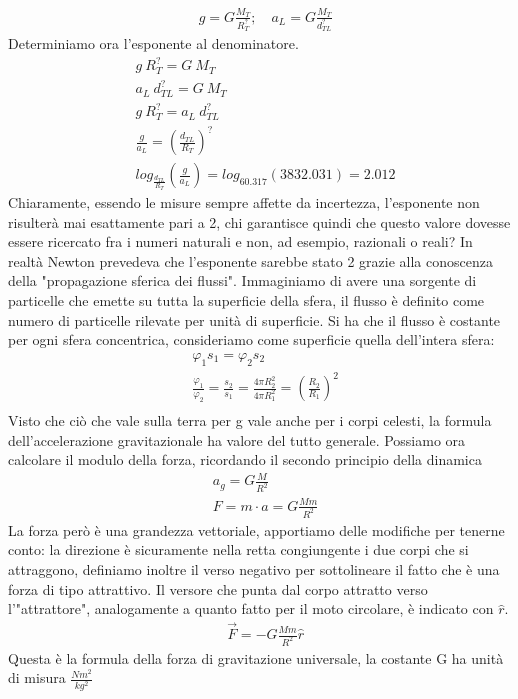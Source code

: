 \begin{align*}
	&g = G \frac{M_T}{R_T^?};\quad a_L = G \frac{M_T}{d_{TL}^?}
\end{align*}
Determiniamo ora l'esponente al denominatore. 
\begin{align*}
	&g\ R_T^? = G\ M_T\\
	&a_L\ d_{TL}^? = G\ M_T\\
	& g\ R_T^? = a_L\ d_{TL}^?\\
	&\frac{g}{a_L} = (\frac{d_{TL}}{R_T})^?\\
	&log_{\frac{d_{TL}}{R_T}}(\frac{g}{a_L}) = log_{60.317}(3832.031) = 2.012
\end{align*}
Chiaramente, essendo le misure sempre affette da incertezza, l'esponente non risulterà mai esattamente pari a 2, chi garantisce quindi che questo valore dovesse essere ricercato fra i numeri naturali e non, ad esempio, razionali o reali? In realtà Newton prevedeva che l'esponente sarebbe stato 2 grazie alla conoscenza della "propagazione sferica dei flussi". Immaginiamo di avere una sorgente di particelle che emette su tutta la superficie della sfera, il flusso è definito come numero di particelle rilevate per unità di superficie. Si ha che il flusso è costante per ogni sfera concentrica, consideriamo come superficie quella dell'intera sfera:
\begin{align*}
	&\varphi_1 s_1 = \varphi_2 s_2\\
	&\frac{\varphi_1 }{\varphi_2} = \frac{s_2}{s_1} =\frac{4\pi R_2^2}{4\pi R_1^2}= (\frac{R_2}{R_1})^2\\
\end{align*}
Visto che ciò che vale sulla terra per g vale anche per i corpi celesti, la formula dell'accelerazione gravitazionale ha valore del tutto generale. Possiamo ora calcolare il modulo della forza, ricordando il secondo principio della dinamica
\begin{align*}
	&a_g = G \frac{M}{R^2}\\
	&F = m\cdot a = G \frac{M m}{R^2}
\end{align*}
La forza però è una grandezza vettoriale, apportiamo delle modifiche per tenerne conto: la direzione è sicuramente nella retta congiungente i due corpi che si attraggono, definiamo inoltre il verso negativo per sottolineare il fatto che è una forza di tipo attrattivo. Il versore che punta dal corpo attratto verso l'"attrattore", analogamente a quanto fatto per il moto circolare, è indicato con  $\hat{r}$.
\begin{align}\label{eq:forzagravitazionale}
	&\vec{F} = - G \frac{M m}{R^2} \hat{r}
\end{align}
 Questa è la formula della forza di gravitazione universale, la costante G ha unità di misura $\frac{N m^2}{kg^2}$
